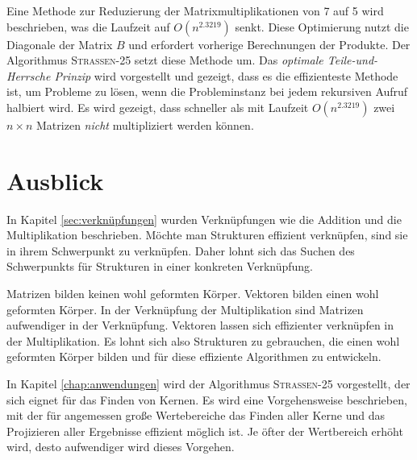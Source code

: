\documentclass{report}
\numberwithin{equation}{section}
\begin{document}
Eine Methode zur Reduzierung der Matrixmultiplikationen von 7 auf 5 wird beschrieben, was die Laufzeit auf $O(n^{2.3219})$ senkt. Diese Optimierung nutzt die Diagonale der Matrix $B$ und erfordert vorherige Berechnungen der Produkte. Der Algorithmus \textsc{Strassen-25} setzt diese Methode um. Das \textit{optimale Teile-und-Herrsche Prinzip} wird vorgestellt und gezeigt, dass es die effizienteste Methode ist, um Probleme zu lösen, wenn die Probleminstanz bei jedem rekursiven Aufruf halbiert wird. Es wird gezeigt, dass schneller als mit Laufzeit $O(n^{2.3219})$ zwei $n \times n$ Matrizen \textit{nicht} multipliziert werden können.

\section{Ausblick}
In Kapitel \ref{sec:verknüpfungen} wurden Verknüpfungen wie die Addition und die Multiplikation beschrieben. Möchte man Strukturen effizient verknüpfen, sind sie in ihrem Schwerpunkt zu verknüpfen. Daher lohnt sich das Suchen des Schwerpunkts für Strukturen in einer konkreten Verknüpfung.

Matrizen bilden keinen wohl geformten Körper. Vektoren bilden einen wohl geformten Körper. In der Verknüpfung der Multiplikation sind Matrizen aufwendiger in der Verknüpfung. Vektoren lassen sich effizienter verknüpfen in der Multiplikation. Es lohnt sich also Strukturen zu gebrauchen, die einen wohl geformten Körper bilden und für diese effiziente Algorithmen zu entwickeln.

In Kapitel \ref{chap:anwendungen} wird der Algorithmus \textsc{Strassen-25} vorgestellt, der sich eignet für das Finden von Kernen. Es wird eine Vorgehensweise beschrieben, mit der für angemessen große Wertebereiche das Finden aller Kerne und das Projizieren aller Ergebnisse effizient möglich ist. Je öfter der Wertbereich erhöht wird, desto aufwendiger wird dieses Vorgehen.
\end{document}
